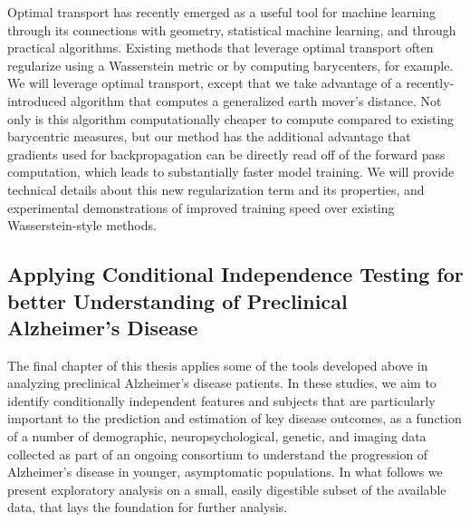 Optimal transport has recently emerged as a useful tool for machine learning through its connections with geometry, statistical machine learning, and through practical algorithms. Existing methods that leverage optimal transport often  regularize using  a Wasserstein metric or by computing barycenters, for example. %
We will leverage optimal transport, except that we take advantage of a recently-introduced algorithm that computes a generalized earth mover's distance.
Not only is this algorithm computationally cheaper to compute compared to existing barycentric measures, but our method has the additional  advantage that gradients used for backpropagation can be directly read off of the forward pass computation, which leads to substantially faster model training.
We will provide technical details about this new regularization term and its properties, 
and 
experimental demonstrations of improved training speed over existing Wasserstein-style methods.

\subsection{Applying Conditional Independence Testing for better Understanding of Preclinical Alzheimer's Disease}

The final chapter of this thesis applies some of the tools developed above in analyzing preclinical Alzheimer's disease patients. 
In these studies, 
we aim to identify conditionally independent features and subjects that are particularly important to the prediction and estimation of
key disease outcomes,
as a function of a number 
of demographic, neuropsychological,
genetic,
and imaging data collected as 
part of an ongoing consortium 
to understand the progression
of Alzheimer's disease in younger, 
asymptomatic populations.
In what follows we present
exploratory analysis
on a small, easily 
digestible subset of the available data,
that lays the foundation for
further analysis.


